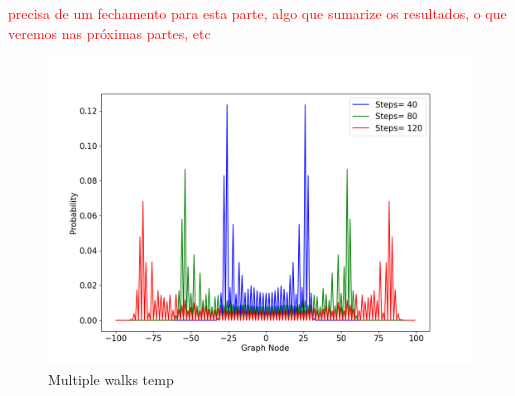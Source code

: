 

                \textcolor{red}{precisa de um fechamento para esta parte, algo que sumarize os resultados, o que veremos nas próximas partes, etc}
                
                \begin{figure}[!h]
                    \centering
                    \includegraphics[scale=0.40]{img/CoinedQW/CoinedMultiplepsi001.png}
                    \caption{Multiple walks temp} 
                    \label{fig:coinedwalk3}
                \end{figure}
                
